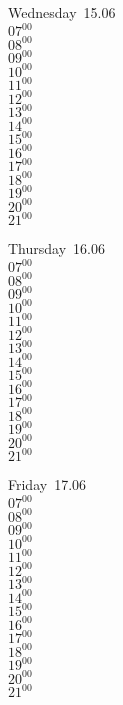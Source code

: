 \documentclass[11pt,a4paper]{book}\usepackage[]{graphicx}\usepackage[]{color}
\begin{document}
\begin{weekdaybox}
  Wednesday~15.06\\
  { 
  \vfill
  $07^{00}$\\
$08^{00}$\\
$09^{00}$\\
$10^{00}$\\
$11^{00}$\\
$12^{00}$\\
$13^{00}$\\
$14^{00}$\\
$15^{00}$\\
$16^{00}$\\
$17^{00}$\\
$18^{00}$\\
$19^{00}$\\
$20^{00}$\\
$21^{00}$\\
  }
\end{weekdaybox}
\clearpage
\begin{headerbox}
\end{headerbox}
\begin{weekdaybox}
  Thursday~16.06\\
  { 
  \vfill
  $07^{00}$\\
$08^{00}$\\
$09^{00}$\\
$10^{00}$\\
$11^{00}$\\
$12^{00}$\\
$13^{00}$\\
$14^{00}$\\
$15^{00}$\\
$16^{00}$\\
$17^{00}$\\
$18^{00}$\\
$19^{00}$\\
$20^{00}$\\
$21^{00}$\\
  }
\end{weekdaybox} 
\begin{weekdaybox}
  Friday~17.06\\
  { 
  \vfill
  $07^{00}$\\
$08^{00}$\\
$09^{00}$\\
$10^{00}$\\
$11^{00}$\\
$12^{00}$\\
$13^{00}$\\
$14^{00}$\\
$15^{00}$\\
$16^{00}$\\
$17^{00}$\\
$18^{00}$\\
$19^{00}$\\
$20^{00}$\\
$21^{00}$\\
  }
\end{weekdaybox}
\end{document}
